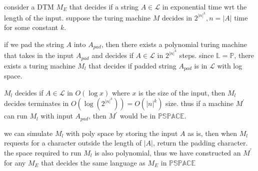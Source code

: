 \documentclass{article}
\newcommand{\LSPACE}{\mathbb{L}}
\newcommand{\PSPACE}{\mathbb{PSPACE}}
\newcommand{\PTIME}{\mathbb{P}}
\begin{document}
\begin{enumerate}
    consider a DTM \(M_E\) that decides if a string \(A\in\mathcal L\) in exponential time wrt the length of the input. suppose the turing machine \(M\) decides  in \(2^{|n|^k}, n=|A|\) time for some constant \(k\). 
    

    if we pad the string \(A\) into \(A_{pad}\), then there exists a polynomial turing machine that takes in the input \(A_{pad}\) and decides if \(A\in\mathcal{L}\) in \(2^{|n|^k}\) steps. since \(\LSPACE = \PTIME\), there exists a turing machine \(M_{l}\) that decides if padded string \(A_{pad}\) is in \(\mathcal{L}\) with log space. 

    
    \(M_l\) decides if \(A\in\mathcal{L}\) in \(O(\log x)\) where \(x\) is the size of the input, then \(M_l\) decides terminates in \(O(\log(2^{|n|^k}))=O(|n|^k)\) size. thus if a machine \(M^\prime\) can run \(M_l\) with input \(A_{pad}\), then \(M^\prime\) would be in \(\PSPACE\).

    we can simulate \(M_l\) with poly space by storing the input \(A \) as is, then when \(M_l\) requests for a character outside the length of \(|A|\), return the padding character. the space required to run \(M_l \) is also polynomial, thus we have constructed an \(M^\prime\) for any \(M_E\) that decides the same language as \(M_E\) in \(\PSPACE\)

    







    



\end{enumerate}
\end{document}
